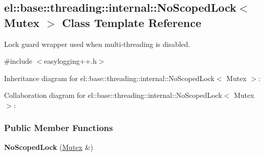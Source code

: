 \hypertarget{a00061}{}\subsection{el\+:\+:base\+:\+:threading\+:\+:internal\+:\+:No\+Scoped\+Lock$<$ Mutex $>$ Class Template Reference}
\label{a00061}


Lock guard wrapper used when multi-\/threading is disabled.  




{\ttfamily \#include $<$easylogging++.\+h$>$}



Inheritance diagram for el\+:\+:base\+:\+:threading\+:\+:internal\+:\+:No\+Scoped\+Lock$<$ Mutex $>$\+:


Collaboration diagram for el\+:\+:base\+:\+:threading\+:\+:internal\+:\+:No\+Scoped\+Lock$<$ Mutex $>$\+:
\subsubsection*{Public Member Functions}
\begin{DoxyCompactItemize}
\item 
\hypertarget{a00061_a020f8cea6e83f40ea29662ef57a58235}{}{\bfseries No\+Scoped\+Lock} (\hyperlink{a00060}{Mutex} \&)\label{a00061_a020f8cea6e83f40ea29662ef57a58235}

\end{DoxyCompactItemize}
